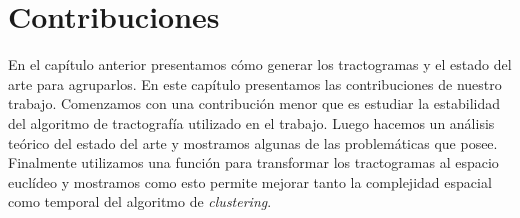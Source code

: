 \chapter{Contribuciones}

En el cap\'itulo anterior presentamos c\'omo generar los tractogramas y el 
estado del arte para agruparlos. En este cap\'itulo presentamos las contribuciones
de nuestro trabajo. Comenzamos con una contribuci\'on menor que es estudiar la 
estabilidad del algoritmo de tractograf\'ia utilizado en el trabajo. Luego hacemos
un an\'alisis te\'orico del estado del arte y mostramos algunas de las 
problem\'aticas que posee. Finalmente utilizamos una funci\'on para transformar
los tractogramas al espacio eucl\'ideo y mostramos como esto permite mejorar tanto
la complejidad espacial como temporal del algoritmo de \textit{clustering}. \\









\blankpage

